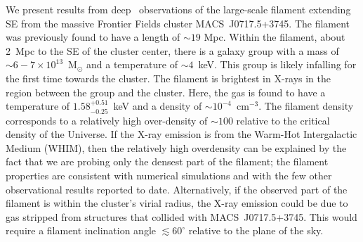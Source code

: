 We present results from deep \chandra\ observations of the large-scale filament extending SE from the massive Frontier Fields cluster MACS~J0717.5+3745. The filament was previously found to have a length of $\sim 19$ Mpc. Within the filament, about 2~Mpc to the SE of the cluster center, there is a galaxy group with a mass of $\sim 6-7\times 10^{13}$~M$_\odot$ and a temperature of $\sim 4$~keV. This group is likely infalling for the first time towards the cluster. The filament is brightest in X-rays in the region between the group and the cluster. Here, the gas is found to have a temperature of $1.58_{-0.25}^{+0.51}$~keV and a density of $\sim 10^{-4}$~cm$^{-3}$. The filament density corresponds to a relatively high over-density of $\sim 100$ relative to the critical density of the Universe. If the X-ray emission is from the Warm-Hot Intergalactic Medium (WHIM), then the relatively high overdensity can be explained by the fact that we are probing only the densest part of the filament; the filament properties are consistent with numerical simulations and with the few other observational results reported to date. Alternatively, if the observed part of the filament is within the cluster's virial radius, the X-ray emission could be due to gas stripped from structures that collided with MACS~J0717.5+3745. This would require a filament inclination angle $\lesssim 60^\circ$ relative to the plane of the sky.
